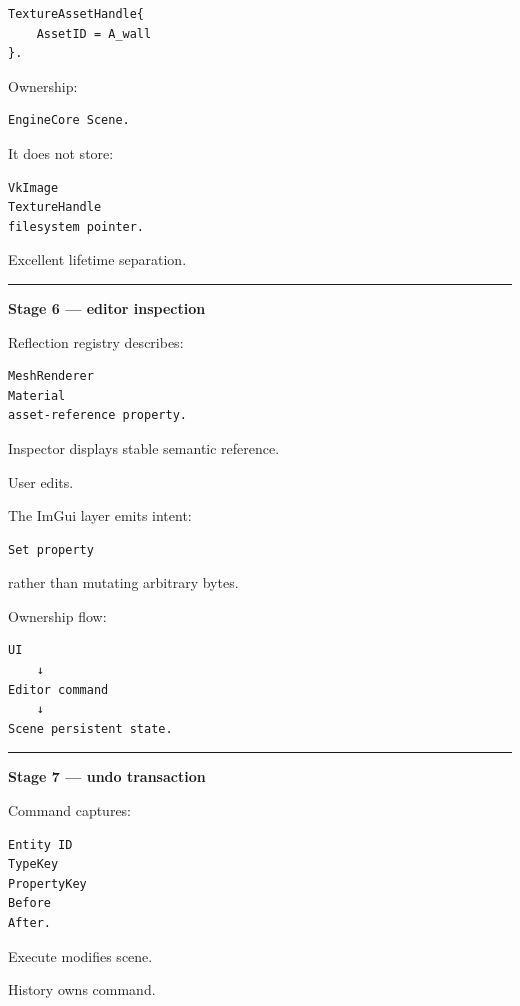 \begin{verbatim}
TextureAssetHandle{
    AssetID = A_wall
}.
\end{verbatim}

Ownership:

\begin{verbatim}
EngineCore Scene.
\end{verbatim}

It does not store:

\begin{verbatim}
VkImage
TextureHandle
filesystem pointer.
\end{verbatim}

Excellent lifetime separation.

\begin{center}\rule{0.5\linewidth}{0.5pt}\end{center}

\textbf{Stage 6 --- editor inspection}

Reflection registry describes:

\begin{verbatim}
MeshRenderer
Material
asset-reference property.
\end{verbatim}

Inspector displays stable semantic reference.

User edits.

The ImGui layer emits intent:

\begin{verbatim}
Set property
\end{verbatim}

rather than mutating arbitrary bytes.

Ownership flow:

\begin{verbatim}
UI
    ↓
Editor command
    ↓
Scene persistent state.
\end{verbatim}

\begin{center}\rule{0.5\linewidth}{0.5pt}\end{center}

\textbf{Stage 7 --- undo transaction}

Command captures:

\begin{verbatim}
Entity ID
TypeKey
PropertyKey
Before
After.
\end{verbatim}

Execute modifies scene.

History owns command.

